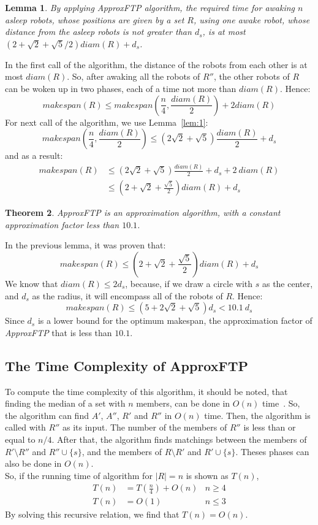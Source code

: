 \documentclass[review]{elsarticle}
\newtheorem{theorem}{Theorem}
\newtheorem{lemma}[theorem]{Lemma}
\def\QED{\ensuremath{{\square}}}
\def\markatright#1{\leavevmode\unskip\nobreak\quad\hspace*{\fill}{#1}}
\newenvironment{proof}
{\begin{trivlist}\item[\hskip\labelsep{\bf Proof.}]}
  {\markatright{\QED}\end{trivlist}}
\begin{document}
\begin{lemma}
\label{lem:2}
By applying \textit{ApproxFTP} algorithm, the required time for awaking $n$ asleep robots, whose positions are given by a set $R$, using one awake robot, whose distance from the asleep robots is not greater than $d_s$, is at most ${ (2+\sqrt{2}+\sqrt{5}/2)diam(R)+d_s }$.
\end{lemma}
\begin{proof}
In the first call of the algorithm, the distance of the robots from each other is at most $diam(R)$. So, after awaking all the robots of $R''$, the other robots of $R$ can be woken up in two phases, each of a time not more than $diam(R)$. Hence:
$$ makespan(R) \leq makespan(\frac{n}{4},\frac{diam(R)}{2})+2diam(R) $$
For next call of the algorithm, we use Lemma~\ref{lem:1}:
$$ makespan(\frac{n}{4},\frac{diam(R)}{2}) \leq (2\sqrt{2}+\!\sqrt{5})\frac{diam(R)}{2}+d_s $$
and as a result:
\begin{align}
makespan(R) &\leq (2\sqrt{2}+\!\sqrt{5})\frac{diam(R)}{2}+d_s+2~diam(R) \nonumber\\
			&\leq (2+\sqrt{2}+\frac{\sqrt{5}}{2})diam(R)+d_s \nonumber
\end{align}
\end{proof}

\begin{theorem}
\textit{ApproxFTP} is an approximation algorithm, with a constant approximation factor less than $10.1$.
\end{theorem}
\begin{proof}
In the previous lemma, it was proven that:
$$ makespan(R) \leq (2+\sqrt{2}+\frac{\sqrt{5}}{2})diam(R)+d_s $$
We know that $diam(R)\leq2d_s$, because, if we draw a circle with $s$ as the center, and $d_s$ as the radius, it will encompass all of the robots of $R$. Hence:
$$ makespan(R) \leq (5+2\sqrt{2}+\sqrt{5})d_s < 10.1~d_s $$
Since $d_s$ is a lower bound for the optimum makespan, the approximation factor of \textit{ApproxFTP} that is less than $10.1$.
\end{proof}

\subsection{The Time Complexity of ApproxFTP}
To compute the time complexity of this algorithm, it should be noted, that finding the median of a set with $n$ members, can be done in $O(n)$ time~\cite{CLRS}. So, the algorithm can find $A'$, $A''$, $R'$ and $R''$ in $O(n)$ time. Then, the algorithm is called with $R''$ as its input. The number of the members of $R''$ is less than or equal to $n/4$. After that, the algorithm finds matchings between the members of $R'\setminus R''$ and $R''\cup\{s\}$, and the members of $R\setminus R'$ and $R'\cup\{s\}$. Theses phases can also be done in $O(n)$.\\
So, if the running time of algorithm for $|R|=n$ is shown as $T(n)$,
\begin{align}
T(n)&=T(\frac{n}{4})+O(n) &n\geq 4 \nonumber\\
T(n)&=O(1) &n\leq 3 \nonumber
\end{align}
By solving this recursive relation, we find that $T(n)=O(n)$.
\end{document}
